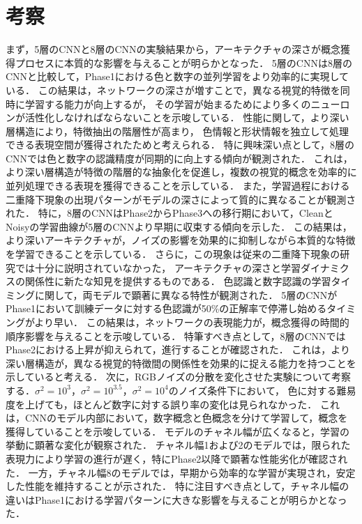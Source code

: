 \chapter{考察}
まず，5層のCNNと8層のCNNの実験結果から，アーキテクチャの深さが概念獲得プロセスに本質的な影響を与えることが明らかとなった．
5層のCNNは8層のCNNと比較して，Phase1における色と数字の並列学習をより効率的に実現している．
この結果は，ネットワークの深さが増すことで，異なる視覚的特徴を同時に学習する能力が向上するが，
その学習が始まるためにより多くのニューロンが活性化しなければならないことを示唆している．
性能に関して，より深い層構造により，特徴抽出の階層性が高まり，
色情報と形状情報を独立して処理できる表現空間が獲得されたためと考えられる．
特に興味深い点として，8層のCNNでは色と数字の認識精度が同期的に向上する傾向が観測された．
これは，より深い層構造が特徴の階層的な抽象化を促進し，複数の視覚的概念を効率的に並列処理できる表現を獲得できることを示している．
また，学習過程における二重降下現象の出現パターンがモデルの深さによって質的に異なることが観測された．
特に，8層のCNNはPhase2からPhase3への移行期において，CleanとNoisyの学習曲線が5層のCNNより早期に収束する傾向を示した．
この結果は，より深いアーキテクチャが，ノイズの影響を効果的に抑制しながら本質的な特徴を学習できることを示している．
さらに，この現象は従来の二重降下現象の研究では十分に説明されていなかった，
アーキテクチャの深さと学習ダイナミクスの関係性に新たな知見を提供するものである．
色認識と数字認識の学習タイミングに関して，両モデルで顕著に異なる特性が観測された．
5層のCNNがPhase1において訓練データに対する色認識が50\%の正解率で停滞し始めるタイミングがより早い．
この結果は，ネットワークの表現能力が，概念獲得の時間的順序影響を与えることを示唆している．
特筆すべき点として，8層のCNNではPhase2における上昇が抑えられて，進行することが確認された．
これは，より深い層構造が，異なる視覚的特徴間の関係性を効果的に捉える能力を持つことを示していると考える．
次に，RGBノイズの分散を変化させた実験について考察する．$\sigma^2 = 10^3$，$\sigma^2 = 10^{3.5}$，$\sigma^2 = 10^4$のノイズ条件下において，
色に対する難易度を上げても，ほとんど数字に対する誤り率の変化は見られなかった．
これは，CNNのモデル内部において，数字概念と色概念を分けて学習して，概念を獲得していることを示唆している．
モデルのチャネル幅が広くなると，学習の挙動に顕著な変化が観察された．
チャネル幅1および2のモデルでは，限られた表現力により学習の進行が遅く，特にPhase2以降で顕著な性能劣化が確認された．
一方，チャネル幅8のモデルでは，早期から効率的な学習が実現され，安定した性能を維持することが示された．
特に注目すべき点として，チャネル幅の違いはPhase1における学習パターンに大きな影響を与えることが明らかとなった．
